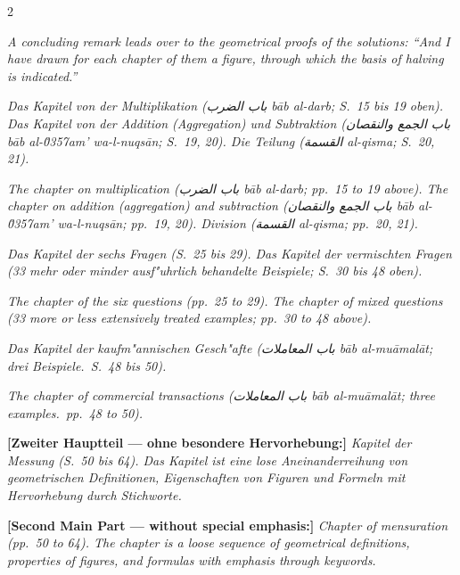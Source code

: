 \documentclass[10pt,a4paper]{article}
\newcommand{\RL}[1]{\beginR#1\endR}
\newcommand{\ar}[1]{{\arabicfont\RL{#1}}}
\newcommand{\enquote}[1]{``#1''}
\begin{document}
\begin{paracol}{2}
\switchcolumn

\textit{A concluding remark leads over to the geometrical proofs of the solutions: \enquote{And I have drawn for each chapter of them a figure, through which the basis of halving is indicated.}}

\switchcolumn*

\textit{Das Kapitel von der Multiplikation (\ar{باب الضرب} \textit{b\=ab al-darb}; S.\ 15 bis 19 oben). Das Kapitel von der Addition (Aggregation) und Subtraktion (\ar{باب الجمع والنقصان} \textit{b\=ab al-\u0357{}am' wa-l-nuqs\=an}; S.\ 19, 20). Die Teilung (\ar{القسمة} \textit{al-qisma}; S.\ 20, 21).}

\switchcolumn

\textit{The chapter on multiplication (\ar{باب الضرب} \textit{b\=ab al-darb}; pp.\ 15 to 19 above). The chapter on addition (aggregation) and subtraction (\ar{باب الجمع والنقصان} \textit{b\=ab al-\u0357{}am' wa-l-nuqs\=an}; pp.\ 19, 20). Division (\ar{القسمة} \textit{al-qisma}; pp.\ 20, 21).}

\switchcolumn*

\textit{Das Kapitel der sechs Fragen (S.\ 25 bis 29). Das Kapitel der vermischten Fragen (33 mehr oder minder ausf"uhrlich behandelte Beispiele; S.\ 30 bis 48 oben).}

\switchcolumn

\textit{The chapter of the six questions (pp.\ 25 to 29). The chapter of mixed questions (33 more or less extensively treated examples; pp.\ 30 to 48 above).}

\switchcolumn*

\textit{Das Kapitel der kaufm"annischen Gesch"afte (\ar{باب المعاملات} \textit{b\=ab al-mu\=amal\=at}; drei Beispiele.\ S.\ 48 bis 50).}

\switchcolumn

\textit{The chapter of commercial transactions (\ar{باب المعاملات} \textit{b\=ab al-mu\=amal\=at}; three examples.\ pp.\ 48 to 50).}

\switchcolumn*

\textbf{[Zweiter Hauptteil --- ohne besondere Hervorhebung:]} \textit{Kapitel der Messung (S.\ 50 bis 64). Das Kapitel ist eine lose Aneinanderreihung von geometrischen Definitionen, Eigenschaften von Figuren und Formeln mit Hervorhebung durch Stichworte.}

\switchcolumn

\textbf{[Second Main Part --- without special emphasis:]} \textit{Chapter of mensuration (pp.\ 50 to 64). The chapter is a loose sequence of geometrical definitions, properties of figures, and formulas with emphasis through keywords.}


\end{paracol}
\end{document}

